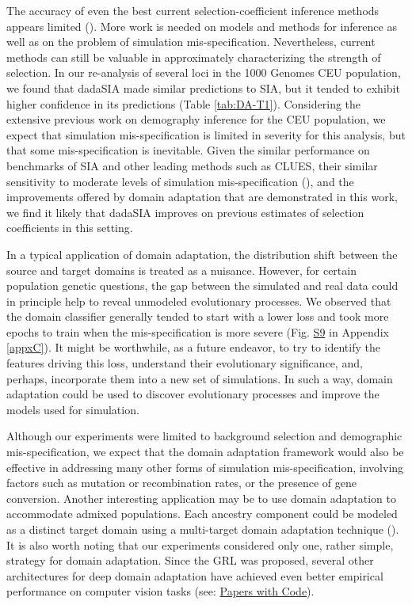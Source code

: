 The accuracy of even the best current selection-coefficient inference methods appears limited (\cite{flagel_unreasonable_2019,torada_imagene_2019,hejase_deep-learning_2022,stern_approximate_2019}). More work is needed on models and methods for inference as well as on the problem of simulation mis-specification. Nevertheless, current methods can still be valuable in approximately characterizing the strength of selection. In our re-analysis of several loci in the 1000 Genomes CEU population, we found that \ac{dadaSIA} made similar predictions to \ac{SIA}, but it tended to exhibit higher confidence in its predictions (Table \ref{tab:DA-T1}). Considering the extensive previous work on demography inference for the CEU population, we expect that simulation mis-specification is limited in severity for this analysis, but that some mis-specification is inevitable. Given the similar performance on benchmarks of \ac{SIA} and other leading methods such as CLUES, their similar sensitivity to moderate levels of simulation mis-specification (\cite{hejase_deep-learning_2022}), and the improvements offered by domain adaptation that are demonstrated in this work, we find it likely that \ac{dadaSIA} improves on previous estimates of selection coefficients in this setting.

In a typical application of domain adaptation, the distribution shift between the source and target domains is treated as a nuisance. However, for certain population genetic questions, the gap between the simulated and real data could in principle help to reveal unmodeled evolutionary processes. We observed that the domain classifier generally tended to start with a lower loss and took more epochs to train when the mis-specification is more severe (Fig. \href{https://journals.plos.org/plosgenetics/article?id=10.1371/journal.pgen.1011032#sec018}{S9} in Appendix \ref{appxC}). It might be worthwhile, as a future endeavor, to try to identify the features driving this loss, understand their evolutionary significance, and, perhaps, incorporate them into a new set of simulations. In such a way, domain adaptation could be used to discover evolutionary processes and improve the models used for simulation.

Although our experiments were limited to background selection and demographic mis-specification, we expect that the domain adaptation framework would also be effective in addressing many other forms of simulation mis-specification, involving factors such as mutation or recombination rates, or the presence of gene conversion. Another interesting application may be to use domain adaptation to accommodate admixed populations. Each ancestry component could be modeled as a distinct target domain using a multi-target domain adaptation technique (\cite{isobe_multi-target_2021,nguyen-meidine_unsupervised_2021,roy_curriculum_2021}). It is also worth noting that our experiments considered only one, rather simple, strategy for domain adaptation. Since the \ac{GRL} was proposed, several other architectures for deep domain adaptation have achieved even better empirical performance on computer vision tasks (see: \href{https://paperswithcode.com/task/domain-adaptation}{Papers with Code}).


